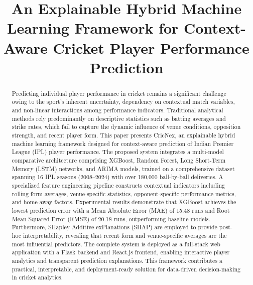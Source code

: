 \documentclass[conference]{IEEEtran}
\begin{document}
\title{An Explainable Hybrid Machine Learning Framework for Context-Aware Cricket Player Performance Prediction}

\author{
}

\maketitle

\begin{abstract}
Predicting individual player performance in cricket remains a significant challenge owing to the sport's inherent uncertainty, dependency on contextual match variables, and non-linear interactions among performance indicators. Traditional analytical methods rely predominantly on descriptive statistics such as batting averages and strike rates, which fail to capture the dynamic influence of venue conditions, opposition strength, and recent player form. This paper presents CricNex, an explainable hybrid machine learning framework designed for context-aware prediction of Indian Premier League (IPL) player performance. The proposed system integrates a multi-model comparative architecture comprising XGBoost, Random Forest, Long Short-Term Memory (LSTM) networks, and ARIMA models, trained on a comprehensive dataset spanning 16 IPL seasons (2008–2024) with over 180,000 ball-by-ball deliveries. A specialized feature engineering pipeline constructs contextual indicators including rolling form averages, venue-specific statistics, opponent-specific performance metrics, and home-away factors. Experimental results demonstrate that XGBoost achieves the lowest prediction error with a Mean Absolute Error (MAE) of 15.48 runs and Root Mean Squared Error (RMSE) of 20.18 runs, outperforming baseline models. Furthermore, SHapley Additive exPlanations (SHAP) are employed to provide post-hoc interpretability, revealing that recent form and venue-specific averages are the most influential predictors. The complete system is deployed as a full-stack web application with a Flask backend and React.js frontend, enabling interactive player analytics and transparent prediction explanations. This framework contributes a practical, interpretable, and deployment-ready solution for data-driven decision-making in cricket analytics.
\end{abstract}
\end{document}
